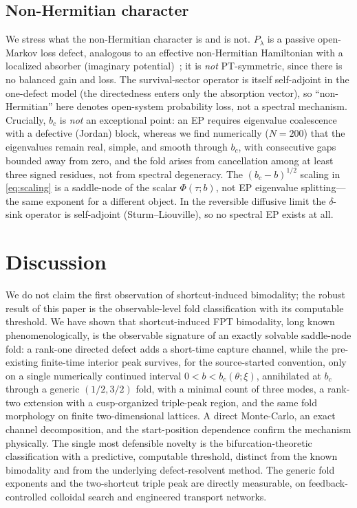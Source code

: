 \documentclass[reprint,amsmath,amssymb,aps,prresearch,longbibliography]{revtex4-2}
\begin{document}
\subsection{Non-Hermitian character}\label{sec:physC}
We stress what the non-Hermitian character is and is not. $P_\lambda$ is a passive open-Markov loss
defect, analogous to an effective non-Hermitian Hamiltonian with a localized absorber (imaginary
potential)~\cite{Ashida2020}; it is \emph{not} PT-symmetric, since there is no balanced gain and loss.
The survival-sector operator is itself self-adjoint in the one-defect model (the directedness enters
only the absorption vector), so ``non-Hermitian'' here denotes open-system probability loss, not a
spectral mechanism. Crucially, $b_c$ is \emph{not} an exceptional point: an EP requires eigenvalue
coalescence with a defective (Jordan) block, whereas we find numerically ($N=200$) that the eigenvalues
remain real, simple, and smooth through $b_c$, with consecutive gaps bounded away from zero, and the
fold arises from cancellation among at least three signed residues, not from spectral degeneracy. The
$(b_c-b)^{1/2}$ scaling in \eqref{eq:scaling} is a saddle-node of the scalar $\Phi(\tau;b)$, not EP
eigenvalue splitting---the same exponent for a different object. In the reversible diffusive limit the
$\delta$-sink operator is self-adjoint (Sturm--Liouville), so no spectral EP exists at all.

\section{Discussion}\label{sec:discussion}
We do not claim the first observation of shortcut-induced bimodality; the robust result of this
paper is the observable-level fold classification with its computable threshold.
We have shown that shortcut-induced FPT bimodality, long known phenomenologically, is the observable
signature of an exactly solvable saddle-node fold: a rank-one directed defect adds a short-time
capture channel, while the pre-existing finite-time interior peak survives, for the source-started
convention, only on a single numerically continued interval $0<b<b_c(\theta;\xi)$, annihilated at
$b_c$ through a generic $(1/2,3/2)$ fold, with a minimal count
of three modes, a rank-two extension with a cusp-organized triple-peak region, and the same fold
morphology on finite two-dimensional lattices. A direct Monte-Carlo, an exact channel decomposition,
and the start-position dependence confirm the mechanism physically. The single most defensible novelty
is the bifurcation-theoretic classification with a predictive, computable threshold, distinct from the
known bimodality and from the underlying defect-resolvent method. The generic fold exponents and the
two-shortcut triple peak are directly measurable, on feedback-controlled colloidal search and
engineered transport networks.
\end{document}

